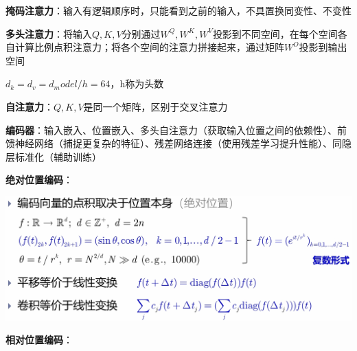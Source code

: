 	\textbf{掩码注意力}：输入有逻辑顺序时，只能看到之前的输入，不具置换同变性、不变性
	
	\textbf{多头注意力}：将输入$Q,K,V$分别通过$W^{Q},W^{K},W^{V}$投影到不同空间，在每个空间各自计算比例点积注意力；将各个空间的注意力拼接起来，通过矩阵$W^{O}$投影到输出空间
	
	$d_k=d_v=d_model/h=64$，h称为头数
	
	\textbf{自注意力}：$Q,K,V$是同一个矩阵，区别于交叉注意力
	
	\textbf{编码器}：输入嵌入、位置嵌入、多头自注意力（获取输入位置之间的依赖性）、前馈神经网络（捕捉更复杂的特征）、残差网络连接（使用残差学习提升性能）、同隐层标准化（辅助训练）
	
	\textbf{绝对位置编码}：
	
	\begin{figurehere}
		\centering
		\includegraphics[width=1\linewidth]{image08}
		\label{fig:image08}
	\end{figurehere}
	
	\textbf{相对位置编码}：
	
